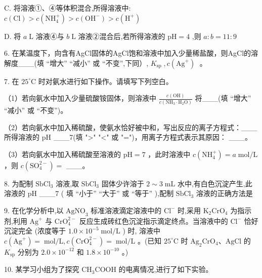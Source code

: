 \documentclass[10pt]{article}
\begin{document}
C. 将溶液①、④等体积混合,所得溶液中: \(c\left( \mathrm{{Cl}}\right) > c\left( {\mathrm{{NH}}}_{4}^{ + }\right) > c\left( {\mathrm{{OH}}}^{ - }\right) > c\left( {\mathrm{H}}^{ + }\right)\)

D. 将 \(a\mathrm{\;L}\) 溶液④与 \(b\mathrm{\;L}\) 溶液②混合后,若所得溶液的 \(\mathrm{{pH}} = 4\) ,则 \(a : b = {11} : 9\)

6. 在某温度下，向含有AgCl固体的AgCl饱和溶液中加入少量稀盐酸，则AgCl的溶解度\_\_\_(填 “增大” “减小” 或 “不变”,下同）, \({K}_{\mathrm{{sp}}}\;,c\left( {\mathrm{{Ag}}}^{ + }\right) \;\) 。

7. 在 \({25}^{ \circ }\mathrm{C}\) 时对氨水进行如下操作。请填写下列空白。

（1）若向氨水中加入少量硫酸铵固体，则溶液中 \(\frac{c\left( \mathrm{{OH}}\right) }{c\left( {{\mathrm{{NH}}}_{3} \cdot {\mathrm{H}}_{2}\mathrm{O}}\right) }\) 将\_\_\_(填 “增大” “减小” 或 “不变”)。

（2）若向氨水中加入稀硫酸，使氨水恰好被中和，写出反应的离子方程式：\_\_\_ 所得溶液的 \(\mathrm{{pH}}\) \_\_\_7(填 ">" "<" 或 "=")，用离子方程式表示其原因： \_\_\_。

（3）若向氨水中加入稀硫酸至溶液的 \(\mathrm{{pH}} = 7\) ，此时溶液中 \(c\left( {\mathrm{{NH}}}_{4}^{ + }\right) = a\mathrm{\;{mol}}/\mathrm{L}\) ，则 \(c\left( {\mathrm{{SO}}}_{4}^{2 - }\right) =\) \_\_\_。

8. 为配制 \({\mathrm{{SbCl}}}_{3}\) 溶液,取 \({\mathrm{{SbCl}}}_{3}\) 固体少许溶于 \(2 \sim 3\mathrm{\;{mL}}\) 水中,有白色沉淀产生,此溶液的 \(\mathrm{{pH}}\) \_\_\_7 ( 填 “小于” “大于” 或 “等于” ),配制 \({\mathrm{{SbCl}}}_{3}\) 溶液的正确方法是

9. 在化学分析中,以 \({\mathrm{{AgNO}}}_{3}\) 标准溶液滴定溶液中的 \({\mathrm{{Cl}}}^{ - }\) 时,采用 \({\mathrm{K}}_{2}{\mathrm{{CrO}}}_{4}\) 为指示剂,利用 \({\mathrm{{Ag}}}^{ + }\) 与 \({\mathrm{{CrO}}}_{4}^{2 - }\) 反应生成砖红色沉淀指示滴定终点。当溶液中的 \({\mathrm{{Cl}}}^{ - }\) 恰好沉淀完全 (浓度等于 \({1.0} \times {10}^{-5}\mathrm{\;{mol}}/\mathrm{L}\) ) 时, 溶液中 \(c\left( {\mathrm{{Ag}}}^{ + }\right) = \;\mathrm{{mol}}/\mathrm{L},c\left( {\mathrm{{CrO}}}_{4}^{2 - }\right) = \;\mathrm{{mol}}/\mathrm{L}\) 。(已知 \({25}^{ \circ }\mathrm{C}\) 时 \({\mathrm{{Ag}}}_{2}{\mathrm{{CrO}}}_{4}\text{、}\mathrm{{AgCl}}\) 的 \({K}_{\mathrm{{sp}}}\) 分别为 \({2.0} \times {10}^{-{12}}\) 和 \({1.8} \times {10}^{-{10}}\) 。)

10. 某学习小组为了探究 \({\mathrm{{CH}}}_{3}\mathrm{{COOH}}\) 的电离情况,进行了如下实验。
\end{document}
